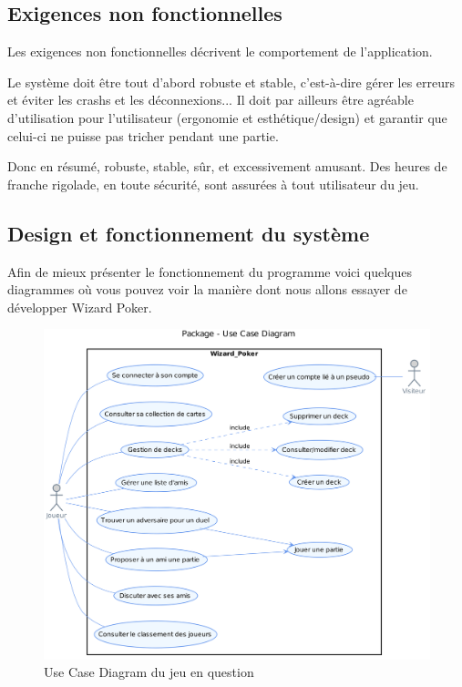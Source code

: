\documentclass[11pt,a4paper]{article}
\begin{document}
\subsection{Exigences non fonctionnelles}
\label{sec:exi-nonfonc-sys}

Les exigences non fonctionnelles décrivent le comportement de
l'application.

Le système doit être tout d'abord robuste et stable, c'est-à-dire
gérer les erreurs et éviter les crashs et les déconnexions... Il doit
par ailleurs être agréable d'utilisation pour l'utilisateur (ergonomie
et esthétique/design) et garantir que celui-ci ne puisse pas tricher
pendant une partie.

Donc en résumé, robuste, stable, sûr, et excessivement amusant. Des
heures de franche rigolade, en toute sécurité, sont assurées à tout
utilisateur du jeu.

\subsection{Design et fonctionnement du système}
\label{sec:design}

Afin de mieux présenter le fonctionnement du programme voici quelques diagrammes où vous pouvez voir la manière dont nous allons essayer de développer Wizard Poker.


\begin{figure}
  \centering
  \includegraphics[width=1\textwidth]{../uml_files/UseCaseDiagram.png}
  \caption{\label{fig:usecase} Use Case Diagram du jeu en question}
\end{figure}
\end{document}
